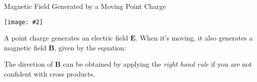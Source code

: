\documentclass[12pt,aspectratio=169]{beamer}
\newcommand{\pic}[2]{\texttt{[image: \#2]}}
\newcommand{\mb}[1]{\mathbf{#1}}
\newcommand{\eq}[2]{\vspace{#1}{\Large\begin{displaymath}#2\end{displaymath}}}
\begin{document}
\begin{frame}{Magnetic Field Generated by a Moving Point Charge}
  \begin{center}
    \pic{.35}{pointchargeB.png}
  \end{center}
  A point charge generates an electric field $\mb{E}$. When it's moving, it
  also generates a magnetic field $\mb{B}$, given by the equation:

  \eq{-.2in}{
    \boxed{\mb{B}=\frac{\mu_0}{4\pi}\frac{q\mb{v}\times\hat{\mb{r}}}{r^2}}
  }

  The direction of $\mb{B}$ can be obtained by applying the
  \emph{right hand rule} if you are not confident with cross products.
\end{frame}



%    
%
\end{document}
